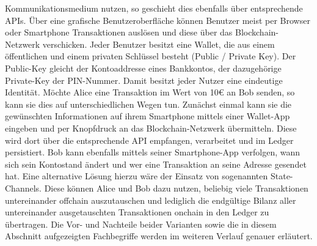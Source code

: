 Kommunikationsmedium nutzen, so geschieht dies ebenfalls über entsprechende \ac{API}s. Über eine grafische Benutzeroberfläche können Benutzer meist per Browser oder Smartphone Transaktionen auslösen und diese über das Blockchain-Netzwerk verschicken. Jeder Benutzer besitzt eine Wallet, die aus einem öffentlichen und einem privaten Schlüssel besteht (Public / Private Key). Der Public-Key gleicht der Kontoaddresse eines Bankkontos, der dazugehörige Private-Key der PIN-Nummer. Damit besitzt jeder Nutzer eine eindeutige Identität. Möchte Alice eine Transaktion im Wert von 10€ an Bob senden, so kann sie dies auf unterschiedlichen Wegen tun. Zunächst einmal kann sie die gewünschten Informationen auf ihrem Smartphone mittels einer Wallet-App eingeben und per Knopfdruck an das Blockchain-Netzwerk übermitteln. Diese wird dort über die entsprechende \ac{API} empfangen, verarbeitet und im Ledger persistiert. Bob kann ebenfalls mittels seiner Smartphone-App verfolgen, wann sich sein Kontostand ändert und wer eine Transaktion an seine Adresse gesendet hat. Eine alternative Lösung hierzu wäre der Einsatz von sogenannten State-Channels. Diese können Alice und Bob dazu nutzen, beliebig viele Transaktionen untereinander offchain auszutauschen und lediglich die endgültige Bilanz aller untereinander ausgetauschten Transaktionen onchain in den Ledger zu übertragen. Die Vor- und Nachteile beider Varianten sowie die in diesem Abschnitt aufgezeigten Fachbegriffe werden im weiteren Verlauf genauer erläutert.



